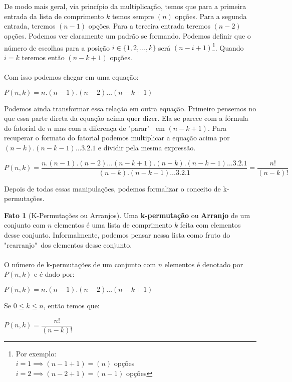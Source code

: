 \documentclass[a4paper,11pt,oneside]{book}
\theoremstyle{definition}
\theoremstyle{break}
\newtheorem{fact}{Fato}[section]
\begin{document}
\\
\\
De modo mais geral, via princípio da multiplicação, temos que para a primeira entrada da lista de comprimento $k$ temos sempre $(n)$ opções. Para a segunda entrada, teremos $(n - 1)$ opções. Para a terceira entrada teremos $(n - 2)$ opções. Podemos ver claramente um padrão se formando. Podemos definir que o número de escolhas para a posição $i \in \{1,2,\dots,k\}$ será $(n - i + 1)$\footnote{Por exemplo: \\ $i = 1 \implies (n - 1 + 1) = (n)$ opções \\ $i = 2 \implies (n - 2 + 1) = (n - 1)$ opções}. Quando $i = k$ teremos então $(n - k + 1)$ opções.
\\
\\
Com isso podemos chegar em uma equação:
\begin{center}
$ P(n,k) = n . (n - 1) . (n - 2) \dots (n - k + 1) $
\end{center}

Podemos ainda transformar essa relação em outra equação. Primeiro pensemos no que essa parte direta da equação acima quer dizer. Ela se parece com a fórmula do fatorial de $n$ mas com a diferença de "parar" \ em $(n - k + 1)$. Para recuperar o formato do fatorial podemos multiplicar a equação acima por $ (n - k) . (n - k - 1) \dots 3 . 2 . 1 $ e dividir pela mesma expressão.

\begin{center}
\small $ P(n,k) = \dfrac{n . (n - 1) . (n - 2) \dots (n - k + 1) . (n - k) . (n - k - 1) \dots 3 . 2 . 1}{(n - k) . (n - k - 1) \dots 3 . 2 . 1} = \dfrac{n!}{(n-k)!}$
\end{center}

Depois de todas essas manipulações, podemos formalizar o conceito de k-permutações.

\begin{fact}[K-Permutações ou Arranjos]
Uma \textbf{k-permutação} ou \textbf{Arranjo} de um conjunto com $n$ elementos é uma lista de comprimento $k$ feita com elementos desse conjunto. Informalmente, podemos pensar nessa lista como fruto do "rearranjo"\ dos elementos desse conjunto.
\\
\\
O número de k-permutações de um conjunto com $n$ elementos é denotado por $P(n,k)$ e é dado por:\\
\begin{center}
$ P(n,k) = n . (n - 1) . (n - 2) \dots (n - k + 1) $
\end{center}

Se $0 \leq k \leq n$, então temos que:\\
\begin{center}
 $ P(n,k) = \dfrac{n!}{(n - k)!} $
\end{center}
\end{fact}
\end{document}
